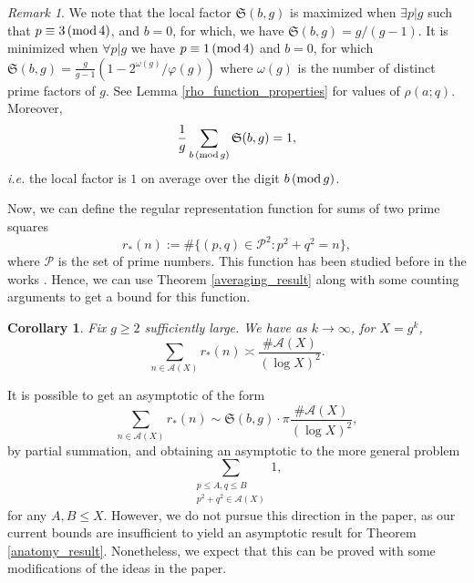 \documentclass[12pt]{amsart}
\newtheorem{cor}[thm]{Corollary}
\theoremstyle{definition}
\theoremstyle{definition}
\theoremstyle{remark}
\newtheorem{remark}[thm]{Remark}
\numberwithin{equation}{section}
\newcommand{\CA}{\mathcal{A}}
\newcommand{\CP}{\mathcal{P}}
\renewcommand{\geq}{\geqslant}
\renewcommand{\leq}{\leqslant}
\renewcommand{\mod}[1]{\,({\rm mod}\,#1)}
\begin{document}
\begin{remark}
We note that the local factor $\mathfrak{S}(b,g)$ is maximized when $\exists p| g$ such that $p\equiv 3\mod 4$, and $b=0$, for which, we have $\mathfrak{S}(b,g)=g/(g-1)$. It is minimized when $\forall p|g$ we have $p\equiv 1 \mod 4$ and $b=0$, for which $\mathfrak{S}(b,g)= \frac{g}{g-1} (1 - 2^{\omega(g)}/\varphi(g))$ where $\omega(g)$ is the number of distinct prime factors of $g$. See Lemma \ref{rho_function_properties} for values of $\rho(a;q)$. Moreover,
$$ \frac{1}{g} \sum_{b\mod g} \mathfrak{S}(b,g) = 1 ,$$
\textit{i.e.} the local factor is $1$ on average over the digit $b\mod g$.
\end{remark}
Now, we can define the regular representation function for sums of two prime squares
$$ r_*(n) := \#\{(p,q)\in \CP^2 : p^2+q^2=n \}, $$
where $\CP$ is the set of prime numbers.
This function has been studied before in the works \cite{MR2418801, MR1833070, Erdos1938, MR4756119, MR4389024}. Hence, we can use Theorem \ref{averaging_result} along with some counting arguments to get a bound for this function.
\begin{cor}\label{main_cor}
Fix $g\geq 2$ sufficiently large. We have as $k\to\infty$, for $X=g^k$,
$$\sum_{n\in \CA(X)} r_*(n) \asymp \frac{\#\CA(X)}{(\log X)^2}. $$
\end{cor}
It is possible to get an asymptotic of the form
$$ \sum_{n\in \CA(X)} r_*(n) \sim \mathfrak{S}(b,g) \cdot \pi \frac{\#\CA(X)}{(\log X)^2}, $$
by partial summation, and obtaining an asymptotic to the more general problem
$$ \sum_{\substack{p \leq A, q\leq B \\ p^2+q^2 \in \CA(X)}} 1 , $$
for any $A,B\leq X$. However, we do not pursue this direction in the paper, as our current bounds are insufficient to yield an asymptotic result for Theorem \ref{anatomy_result}. Nonetheless, we expect that this can be proved with some modifications of the ideas in the paper.
\end{document}
